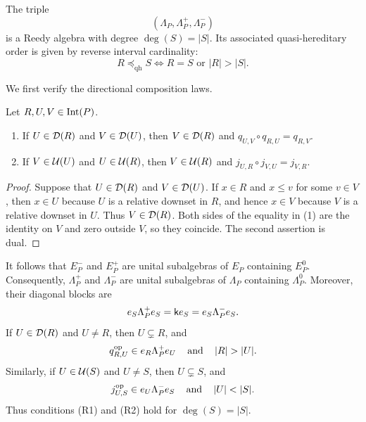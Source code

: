 \begin{theorem}
\label{thm:interval-cardinality-reedy-decomposition}
The triple
\[
(\Lambda_P,\Lambda_P^+,\Lambda_P^-)
\]
is a Reedy algebra with degree $\deg(S)=|S|$.  Its associated
quasi-hereditary order is given by reverse interval cardinality:
\begin{equation}
R\preceq_{\mathrm{qh}}S
\Longleftrightarrow
R=S
\text{ or }
|R|>|S|.
\label{eq:interval-cardinality-QH-order}
\end{equation}
\end{theorem}

We first verify the directional composition laws.

\begin{lemma}
\label{lem:interval-directional-composition}
Let $R,U,V\in\operatorname{Int}(P)$.
\begin{enumerate}[\rm (1)]
    \item If $U\in\mathcal D(R)$ and $V\in\mathcal D(U)$, then $V\in\mathcal D(R)$ and $q_{U,V}\circ q_{R,U} = q_{R,V}$.

    \item If $V\in\mathcal U(U)$ and $U\in\mathcal U(R)$, then $V\in\mathcal U(R)$ and $j_{U,R}\circ j_{V,U}=j_{V,R}$.
\end{enumerate}
\end{lemma}

\begin{proof}
Suppose that $U\in\mathcal D(R)$ and $V\in\mathcal D(U)$.  If $x\in R$ and
$x\leq v$ for some $v\in V$, then $x\in U$ because $U$ is a relative
downset in $R$, and hence $x\in V$ because $V$ is a relative downset in
$U$.  Thus $V\in\mathcal D(R)$.  Both sides of the equality in {\rm (1)} are the identity on $V$ and
zero outside $V$, so they coincide.  The second assertion is dual.
\end{proof}

It follows that $E_P^-$ and $E_P^+$ are unital subalgebras of $E_P$
containing $E_P^0$.  Consequently, $\Lambda_P^+$ and $\Lambda_P^-$ are
unital subalgebras of $\Lambda_P$ containing $\Lambda_P^0$.  Moreover,
their diagonal blocks are
\[
e_S\Lambda_P^+e_S
=
\mathsf{k} e_S
=
e_S\Lambda_P^-e_S.
\]
If $U\in\mathcal D(R)$ and $U\neq R$, then $U\subsetneq R$, and
\[
q_{R,U}^{\op}\in e_R\Lambda_P^+e_U
\qand
|R|>|U|.
\]
Similarly, if $U\in\mathcal U(S)$ and $U\neq S$, then $U\subsetneq S$, and
\[
j_{U,S}^{\op}\in e_U\Lambda_P^-e_S
\qand
|U|<|S|.
\]
Thus conditions {\rm (R1)} and {\rm (R2)} hold for
$\deg(S)=|S|$.  

